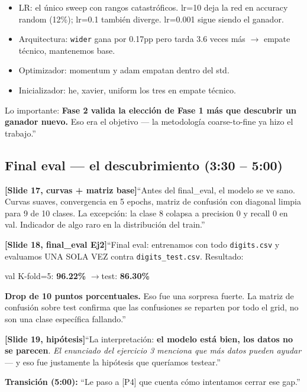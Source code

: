 \documentclass[11pt,a4paper]{article}
\newcommand{\code}[1]{\texttt{\textcolor{accent}{#1}}}
\newcommand{\slidenum}[1]{\textcolor{accent}{\textbf{[Slide #1]}}}
\newcommand{\timing}[1]{\textcolor{muted}{\small (#1)}}
\newcommand{\enunciado}[1]{\textcolor{warn}{\textit{#1}}}
\begin{document}
\begin{itemize}[leftmargin=1.4em, itemsep=1pt]
  \item LR: el único sweep con rangos catastróficos. lr=10 deja la red en accuracy random (12\%); lr=0.1 también diverge. lr=0.001 sigue siendo el ganador.
  \item Arquitectura: \code{wider} gana por 0.17pp pero tarda 3.6 veces más \(\rightarrow\) empate técnico, mantenemos base.
  \item Optimizador: momentum y adam empatan dentro del std.
  \item Inicializador: he, xavier, uniform los tres en empate técnico.
\end{itemize}

Lo importante: \textbf{Fase 2 valida la elección de Fase 1 más que descubrir un ganador nuevo.} Eso era el objetivo --- la metodología coarse-to-fine ya hizo el trabajo.''

\subsection{Final eval --- el descubrimiento \timing{3:30 -- 5:00}}

\slidenum{17, curvas + matriz base}\quad ``Antes del final\_eval, el modelo se ve sano. Curvas suaves, convergencia en 5 epochs, matriz de confusión con diagonal limpia para 9 de 10 clases. La excepción: la clase 8 colapsa a precision 0 y recall 0 en val. Indicador de algo raro en la distribución del train.''

\slidenum{18, final\_eval Ej2}\quad ``Final eval: entrenamos con todo \code{digits.csv} y evaluamos UNA SOLA VEZ contra \code{digits\_test.csv}. Resultado:

\begin{center}\Large
val K-fold=5: \textbf{96.22\%} \quad$\rightarrow$\quad test: \textbf{86.30\%}
\end{center}

\textbf{Drop de 10 puntos porcentuales.} Eso fue una sorpresa fuerte. La matriz de confusión sobre test confirma que las confusiones se reparten por todo el grid, no son una clase específica fallando.''

\slidenum{19, hipótesis}\quad ``La interpretación: \textbf{el modelo está bien, los datos no se parecen}. \enunciado{El enunciado del ejercicio 3 menciona que más datos pueden ayudar} --- y eso fue justamente la hipótesis que queríamos testear.''

\begin{cue}
\textbf{Transición \timing{5:00}:} ``Le paso a [P4] que cuenta cómo intentamos cerrar ese gap.''
\end{cue}
\end{document}
